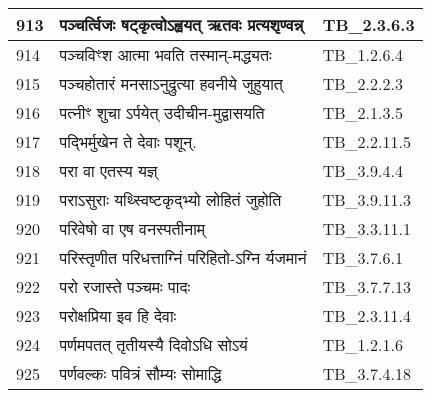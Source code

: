 \documentclass[17pt]{extarticle}
\begin{document}
\begin{longtable}{||p{0.4in}||p{4.9in}||p{0.9in}||}
    913 & पञ्चर्त्विजः षट्कृत्वोऽह्वयत् ऋतवः प्रत्यशृण्वन्न् & TB\_2.3.6.3       \\
    
    \hline
        
    914 & पञ्चविꣳश आत्मा भवति तस्मान्{-}मद्ध्यतः & TB\_1.2.6.4       \\
    
    \hline
        
    915 & पञ्चहोतारं मनसाऽनुद्रुत्या हवनीये जुहुयात् & TB\_2.2.2.3       \\
    
    \hline
        
    916 & पत्नीꣳ शुचा ऽर्पयेत् उदीचीन{-}मुद्वासयति & TB\_2.1.3.5       \\
    
    \hline
        
    917 & पद्भिर्मुखेन ते देवाः पशून्. & TB\_2.2.11.5       \\
    
    \hline
        
    918 & परा वा एतस्य यज्ञ् & TB\_3.9.4.4       \\
    
    \hline
        
    919 & पराऽसुराः यथ्स्विष्टकृद्भ्यो लोहितं जुहोति & TB\_3.9.11.3       \\
    
    \hline
        
    920 & परिवेषो वा एष वनस्पतीनाम् & TB\_3.3.11.1       \\
    
    \hline
        
    921 & परिस्तृणीत परिधत्ताग्निं परिहितो{-}ऽग्नि र्यजमानं & TB\_3.7.6.1       \\
    
    \hline
        
    922 & परो रजास्ते पञ्चमः पादः & TB\_3.7.7.13       \\
    
    \hline
        
    923 & परोक्षप्रिया इव हि देवाः & TB\_2.3.11.4       \\
    
    \hline
        
    924 & पर्णमपतत् तृतीयस्यै दिवोऽधि सोऽयं & TB\_1.2.1.6       \\
    
    \hline
        
    925 & पर्णवल्कः पवित्रं सौम्यः सोमाद्धि & TB\_3.7.4.18       \\
    

\end{longtable}
\end{document}
